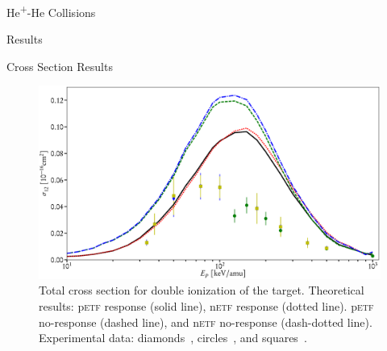 \documentclass[letterpaper, 11 pt]{report}
\begin{document}
\begin{chapter}{\texorpdfstring{He\textsuperscript{+}}{He+}-He Collisions \label{chap:hephe}}
\begin{section}{Results \label{sec:hephe-disc}}
\begin{subsection}{Cross Section Results \label{sec:hephe-res}}
         \begin{figure}[t]
            \centering
            \includegraphics[width = \linewidth]{./images/hephe-cross/HepHe-012.eps}
            \caption[Total cross section for double ionization of the target in He\textsuperscript{+}-He
                     collisions.]
                    {Total cross section for double ionization of the target.
                     Theoretical results: p\textsc{etf} response (solid line), n\textsc{etf} response
                                          (dotted line). p\textsc{etf} no-response (dashed line), and
                                          n\textsc{etf} no-response (dash-dotted line).
                     Experimental data: diamonds~\cite{Dub-89}, circles~\cite{FTFHLP-95}, and
                                        squares~\cite{DT-88}. \label{fig:cs012}}
         \end{figure}


\end{subsection}
\end{section}
\end{chapter}
\end{document}
